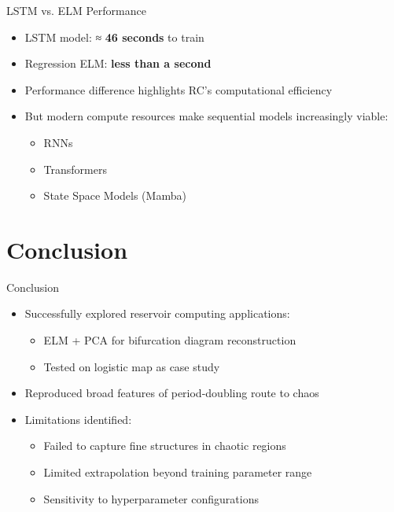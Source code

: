 \documentclass{beamer}
\begin{document}
\begin{frame}{LSTM vs. ELM Performance}
\begin{itemize}
\item LSTM model: ≈ \textbf{46 seconds} to train
\item Regression ELM: \textbf{less than a second}
\item Performance difference highlights RC's computational efficiency
\item But modern compute resources make sequential models increasingly viable:
    \begin{itemize}
    \item RNNs
    \item Transformers
    \item State Space Models (Mamba)
    \end{itemize}
\end{itemize}
\end{frame}

\section{Conclusion}

\begin{frame}{Conclusion}
\begin{itemize}
\item Successfully explored reservoir computing applications:
    \begin{itemize}
    \item ELM + PCA for bifurcation diagram reconstruction
    \item Tested on logistic map as case study
    \end{itemize}
\item Reproduced broad features of period-doubling route to chaos
\item Limitations identified:
    \begin{itemize}
    \item Failed to capture fine structures in chaotic regions
    \item Limited extrapolation beyond training parameter range
    \item Sensitivity to hyperparameter configurations
    \end{itemize}
\end{itemize}
\end{frame}
\end{document}
